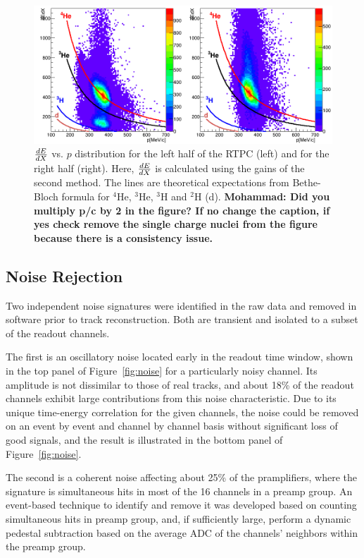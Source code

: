 \documentclass[twocolumn,showpacs,superscriptaddress,groupedaddress]{revtex4}
\begin{document}
\begin{figure}[tb]
\centering
\includegraphics[scale=0.26]{fig/dedx_p_exp_2nd.png}
\caption{$\small{\frac{dE}{dX}}$ vs. $p$ distribution for the left half of the 
   RTPC (left) and for the right half (right). Here, $\small{\frac{dE}{dX}}$ is 
   calculated using the gains of the second method.  The lines are theoretical 
   expectations from Bethe-Bloch formula for $^4$He, $^3$He, $^3$H and $^2$H 
(d).{\bf \color{red} Mohammad: Did you multiply p/c by 2 in the figure? If no 
change the caption, if yes check remove the single charge nuclei from the figure 
because there is a consistency issue.}}
\label{fig:dedx_p_exp_2nd}
\end{figure}

\subsection{Noise Rejection}
Two independent noise signatures were identified in the raw data and removed in software prior to track reconstruction.  Both are transient and isolated to a subset of the readout channels. 

The first is an oscillatory noise located early in the readout time window, shown in the top panel of Figure~\ref{fig:noise} for a particularly noisy channel.  Its amplitude is not dissimilar to those of real tracks, and about 18\% of the readout channels exhibit large contributions from this noise characteristic.  Due to its unique time-energy correlation for the given channels, the noise could be removed on an event by event and channel by channel basis without significant loss of good signals, and the result is illustrated in the bottom panel of Figure~\ref{fig:noise}.

The second is a coherent noise affecting about 25\% of the pramplifiers, where the signature is simultaneous hits in most of the 16 channels in a preamp group.   An event-based technique to identify and remove it was developed based on counting simultaneous hits in preamp group, and, if sufficiently large, perform a dynamic pedestal subtraction based on the average ADC of the channels' neighbors within the preamp group.
\end{document}
